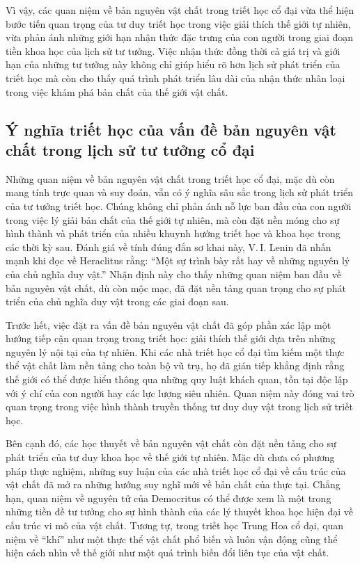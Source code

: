 \documentclass[14pt,a4paper]{extarticle}
\begin{document}
Vì vậy, các quan niệm về bản nguyên vật chất trong triết học cổ đại vừa thể hiện bước tiến quan trọng của tư duy triết học trong việc giải thích thế giới tự nhiên, vừa phản ánh những giới hạn nhận thức đặc trưng của con người trong giai đoạn tiền khoa học của lịch sử tư tưởng. Việc nhận thức đồng thời cả giá trị và giới hạn của những tư tưởng này không chỉ giúp hiểu rõ hơn lịch sử phát triển của triết học mà còn cho thấy quá trình phát triển lâu dài của nhận thức nhân loại trong việc khám phá bản chất của thế giới vật chất.

\subsection{Ý nghĩa triết học của vấn đề bản nguyên vật chất trong lịch sử tư tưởng cổ đại}

Những quan niệm về bản nguyên vật chất trong triết học cổ đại, mặc dù còn mang tính trực quan và suy đoán, vẫn có ý nghĩa sâu sắc trong lịch sử phát triển của tư tưởng triết học. Chúng không chỉ phản ánh nỗ lực ban đầu của con người trong việc lý giải bản chất của thế giới tự nhiên, mà còn đặt nền móng cho sự hình thành và phát triển của nhiều khuynh hướng triết học và khoa học trong các thời kỳ sau. Đánh giá về tính đúng đắn sơ khai này, V.\,I. Lenin đã nhấn mạnh khi đọc về Heraclitus rằng: ``Một sự trình bày rất hay về những nguyên lý của chủ nghĩa duy vật.''\cite{lenin_toantap_t29} Nhận định này cho thấy những quan niệm ban đầu về bản nguyên vật chất, dù còn mộc mạc, đã đặt nền tảng quan trọng cho sự phát triển của chủ nghĩa duy vật trong các giai đoạn sau.

Trước hết, việc đặt ra vấn đề bản nguyên vật chất đã góp phần xác lập một hướng tiếp cận quan trọng trong triết học: giải thích thế giới dựa trên những nguyên lý nội tại của tự nhiên. Khi các nhà triết học cổ đại tìm kiếm một thực thể vật chất làm nền tảng cho toàn bộ vũ trụ, họ đã gián tiếp khẳng định rằng thế giới có thể được hiểu thông qua những quy luật khách quan, tồn tại độc lập với ý chí của con người hay các lực lượng siêu nhiên. Quan niệm này đóng vai trò quan trọng trong việc hình thành truyền thống tư duy duy vật trong lịch sử triết học.

Bên cạnh đó, các học thuyết về bản nguyên vật chất còn đặt nền tảng cho sự phát triển của tư duy khoa học về thế giới tự nhiên. Mặc dù chưa có phương pháp thực nghiệm, những suy luận của các nhà triết học cổ đại về cấu trúc của vật chất đã mở ra những hướng suy nghĩ mới về bản chất của thực tại. Chẳng hạn, quan niệm về nguyên tử của Democritus có thể được xem là một trong những tiền đề tư tưởng cho sự hình thành của các lý thuyết khoa học hiện đại về cấu trúc vi mô của vật chất. Tương tự, trong triết học Trung Hoa cổ đại, quan niệm về ``khí'' như một thực thể vật chất phổ biến và luôn vận động cũng thể hiện cách nhìn về thế giới như một quá trình biến đổi liên tục của vật chất.
\end{document}
